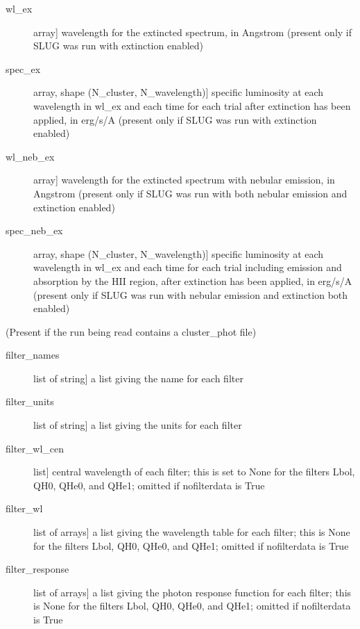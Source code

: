 \documentclass[letterpaper,10pt,english]{sphinxmanual}
\begin{document}
\begin{fulllineitems}
\begin{description}
\begin{description}
\item[{wl\_ex}] \leavevmode{[}array{]}
wavelength for the extincted spectrum, in Angstrom (present
only if SLUG was run with extinction enabled)

\item[{spec\_ex}] \leavevmode{[}array, shape (N\_cluster, N\_wavelength){]}
specific luminosity at each wavelength in wl\_ex and each
time for each trial after extinction has been applied, in
erg/s/A (present only if SLUG was run with extinction
enabled)

\item[{wl\_neb\_ex}] \leavevmode{[}array{]}
wavelength for the extincted spectrum with nebular emission,
in Angstrom (present only if SLUG was run with both nebular
emission and extinction enabled)

\item[{spec\_neb\_ex}] \leavevmode{[}array, shape (N\_cluster, N\_wavelength){]}
specific luminosity at each wavelength in wl\_ex and each
time for each trial including emission and absorption by the
HII region, after extinction has been applied, in erg/s/A
(present only if SLUG was run with nebular emission and
extinction both enabled)

\end{description}

(Present if the run being read contains a cluster\_phot file)
\begin{description}
\item[{filter\_names}] \leavevmode{[}list of string{]}
a list giving the name for each filter

\item[{filter\_units}] \leavevmode{[}list of string{]}
a list giving the units for each filter

\item[{filter\_wl\_cen}] \leavevmode{[}list{]}
central wavelength of each filter; this is set to None for the
filters Lbol, QH0, QHe0, and QHe1; omitted if nofilterdata is
True

\item[{filter\_wl}] \leavevmode{[}list of arrays{]}
a list giving the wavelength table for each filter; this is
None for the filters Lbol, QH0, QHe0, and QHe1; omitted if
nofilterdata is True

\item[{filter\_response}] \leavevmode{[}list of arrays{]}
a list giving the photon response function for each filter;
this is None for the filters Lbol, QH0, QHe0, and QHe1; omitted
if nofilterdata is True


\end{description}
\end{description}
\end{fulllineitems}
\end{document}
